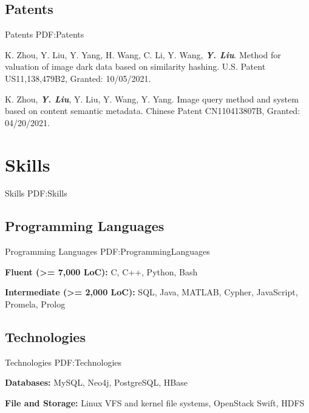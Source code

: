 \documentclass[a4paper,10pt,oneside]{article}
\begin{document}
\begin{body}
\subsection
{Patents}
{Patents}
{PDF:Patents}

\NumberedItem{[1]}
K. Zhou, Y. Liu, Y. Yang, H. Wang, C. Li, Y. Wang, \textbf{\textit{Y. Liu}}. Method for valuation of image dark data based on similarity hashing. U.S. Patent US11,138,479B2, Granted: 10/05/2021. %

\Gap

\NumberedItem{[2]}
K. Zhou, \textbf{\textit{Y. Liu}}, Y. Liu, Y. Wang, Y. Yang. Image query method and system based on content semantic metadata. Chinese Patent CN110413807B, Granted: 04/20/2021. %


\section
{Skills}
{Skills}
{PDF:Skills}

\subsection
{Programming Languages}
{Programming Languages}
{PDF:ProgrammingLanguages}

\BulletItem
\textbf{Fluent (>= 7,000 LoC):} C, C++, Python, Bash

\GapNoBreak

\BulletItem
\textbf{Intermediate (>= 2,000 LoC):} SQL, Java, MATLAB, Cypher, JavaScript, Promela, Prolog



\subsection
{Technologies}
{Technologies}
{PDF:Technologies}

\BulletItem
\textbf{Databases:} MySQL, Neo4j, PostgreSQL, HBase

\GapNoBreak

\BulletItem
\textbf{File and Storage:} Linux VFS and kernel file systems, OpenStack Swift, HDFS


\GapNoBreak


\end{body}
\end{document}

